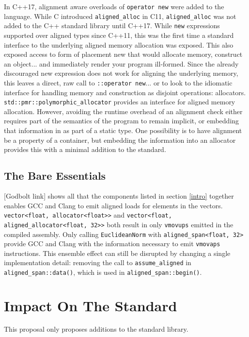 \documentclass[11pt]{article}
\begin{document}
In C++17, alignment aware overloads of \texttt{operator new} were added to the language. While C introduced \texttt{aligned\_alloc} in C11, \texttt{aligned\_alloc} was not added to the C++ standard library until C++17. While \texttt{new} expressions supported over aligned types since C++11, this was the first time a standard interface to the underlying aligned memory allocation was exposed. This also exposed access to form of placement new that would allocate memory, construct an object... and immediately render your program ill-formed.
Since the already discouraged new expression does not work for aligning the underlying memory, this leaves a direct, raw call to \texttt{::operator new}... or to look to the idiomatic interface for handling memory and construction as disjoint operations: allocators. \texttt{std::pmr::polymorphic\_allocator} provides an interface for aligned memory allocation. However, avoiding the runtime overhead of an alignment check either requires part of the semantics of the program to remain implicit, or embedding that information in as part of a static type. One possibility is to have alignment be a property of a container, but embedding the information into an allocator provides this with a minimal addition to the standard.

\subsection{The Bare Essentials}

[Godbolt link] shows all that the components listed in section \ref{intro} together enables GCC and Clang to emit aligned loads for elements in the vectors. \texttt{vector<float, allocator<float>>} and \texttt{vector<float, aligned\_allocator<float, 32>>} both result in only \texttt{vmovups} emitted in the compiled assembly. Only calling \texttt{EuclideanNorm} with \texttt{aligned\_span<float, 32>} provide GCC and Clang with the information necessary to emit \texttt{vmovaps} instructions. This ensemble effect can still be disrupted by changing a single implementation detail: removing the call to \texttt{assume\_aligned} in \texttt{aligned\_span::data()}, which is used in \texttt{aligned\_span::begin()}.

\section{Impact On The Standard}

This proposal only proposes additions to the standard library.
\end{document}
